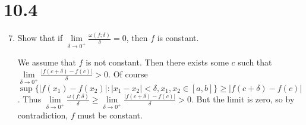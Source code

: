 \documentclass[letterpaper]{article}
\begin{document}
\renewcommand{\labelenumi}{\Alph{enumi}.}
\renewcommand{\labelenumii}{(\alph{enumii})}
\section*{10.4}
\begin{enumerate}
\setcounter{enumi}{6}
\item
Show that if $\lim\limits_{\delta\to0^+}\frac{\omega(f;\delta)}{\delta}=0$,
then $f$ is constant.

We assume that $f$ is not constant. Then there exists some $c$ such that
$\lim\limits_{\delta\to0^+}\frac{\left\lvert f(c+\delta)-f(c)\right\rvert}{\delta}>0$.
Of course
$\sup\{|f(x_1)-f(x_2)|:|x_1-x_2|<\delta,x_1,x_2\in[a,b]\}\ge \left\lvert f(c+\delta)-f(c)\right\rvert$.
Thus
$\lim\limits_{\delta\to0^+}\frac{\omega(f;\delta)}{\delta}\ge\lim\limits_{\delta\to0^+}\frac{\left\lvert f(c+\delta)-f(c)\right\rvert}{\delta}>0$. But the limit is zero, so by contradiction, $f$ must be constant.
\end{enumerate}
\end{document}
